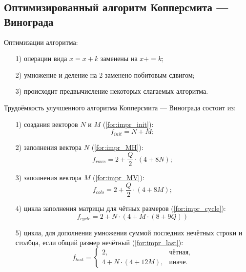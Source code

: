 \documentclass[12pt]{report}
\begin{document}
	\subsection{Оптимизированный алгоритм Копперсмита — Винограда}

	Оптимизации алгоритма:
	\begin{enumerate}
		\item[1)] операции вида $x = x + k$ заменены на $x += k$;
		\item[2)] умножение и деление на 2 заменено побитовым сдвигом;
		\item[3)] происходит предвычисление некоторых слагаемых алгоритма.
	\end{enumerate}
	
	Трудоёмкость улучшенного алгоритма Копперсмита — Винограда состоит из:
	\begin{enumerate}
		\item[1)] создания векторов $N$ и $M$ (\ref{for:impr_init}):
		\begin{equation}
		\label{for:impr_init}
		f_{init} = N + M;
		\end{equation}
		
		\item[2)] заполнения вектора $N$ (\ref{for:impr_MH}):
		\begin{equation}
		\label{for:impr_MH}
		f_{rows} = 2 + \frac{Q}{2} \cdot (4 + 8N);
		\end{equation}
		
		\item[3)] заполнения вектора $M$ (\ref{for:impr_MV}):
		\begin{equation}
		\label{for:impr_MV}
		f_{cols} = 2 + \frac{Q}{2} \cdot (4 + 8M);
		\end{equation}
		
		\item[4)] цикла заполнения матрицы для чётных размеров (\ref{for:impr_cycle}):
		\begin{equation}
		\label{for:impr_cycle}
		f_{cycle} = 2 + N \cdot (4 + M \cdot (8 + 9Q))
		\end{equation}
		
		\item[5)] цикла, для дополнения умножения суммой последних нечётных строки и столбца, если общий размер нечётный (\ref{for:impr_last}):
		\begin{equation}
		\label{for:impr_last}
		f_{last} = 
		\begin{cases}
		2, & \text{чётная,}\\
		4 + N \cdot (4 + 12M), & \text{иначе.}
		\end{cases}
		\end{equation}
	\end{enumerate}
\end{document}
